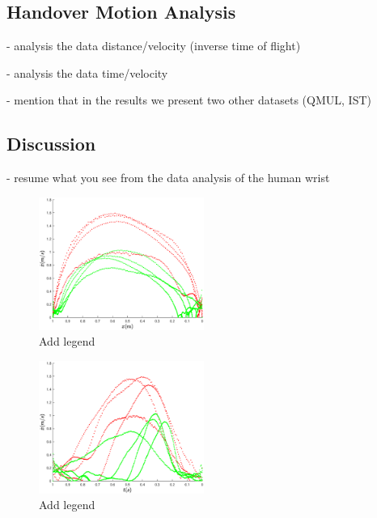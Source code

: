 \subsection{Handover Motion Analysis}

- analysis the data distance/velocity (inverse time of flight)

- analysis the data time/velocity

- mention that in the results we present two other datasets (QMUL, IST)

\subsection{Discussion}

- resume what you see from the data analysis of the human wrist

    \begin{figure}[t]
      \centering
      \includegraphics[width = 0.48\textwidth]{Images/vel_distance_plot.eps}
      \caption{Add legend} 
      \label{fig:vel_distance}
	\end{figure}
	
	
    \begin{figure}[t]
      \centering
      \includegraphics[width = 0.48\textwidth]{Images/vel_time_plot.eps}
      \caption{Add legend} 
      \label{fig:vel_time}
	\end{figure}
	